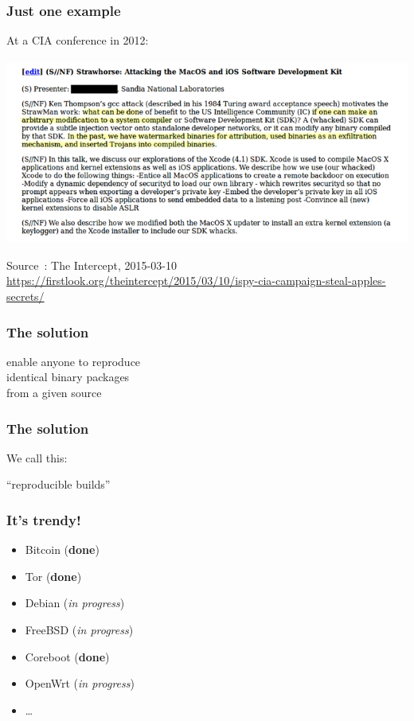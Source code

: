 \documentclass[14pt,ignorenonframetext]{beamer}
\begin{document}
\begin{frame}[fragile]
\frametitle{Just one example}

At a CIA conference in 2012:

\includegraphics[width=\textwidth]{images/strawhorse}

Source~: The Intercept, 2015-03-10
\url{https://firstlook.org/theintercept/2015/03/10/ispy-cia-campaign-steal-apples-secrets/}

\end{frame}

\begin{frame}
\frametitle{The solution}

\begin{center}
\Large
enable anyone to reproduce\\
identical binary packages\\
from a given source
\end{center}

\end{frame}

\begin{frame}
\frametitle{The solution}

We call this:

\begin{center}
\Huge
“reproducible builds”
\end{center}

\end{frame}

\begin{frame}
\frametitle{It's trendy!}

\begin{itemize}
\item Bitcoin (\textbf{done})
\item Tor (\textbf{done})
\item Debian (\emph{in progress})
\item FreeBSD (\emph{in progress})
\item Coreboot (\textbf{done})
\item OpenWrt (\emph{in progress})
\item \ldots{}
\end{itemize}

\end{frame}
\end{document}

